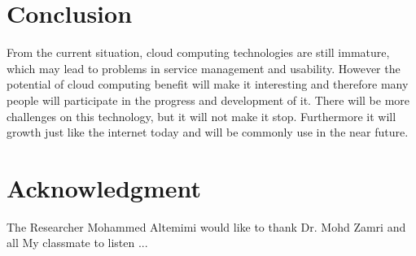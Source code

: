 \documentclass[conference, compsoc]{IEEEtran}
\begin{document}
\section{}



\section{Conclusion}
From the current situation, cloud computing technologies are still immature, which may lead to problems in service management and usability. However  the potential of cloud computing benefit will make it interesting and therefore many people will participate in the progress and development of it. There will be more challenges on this technology, but it will not make it stop. Furthermore it will growth just like the internet today and will be commonly use in the near future.

\section*{Acknowledgment}
The Researcher Mohammed Altemimi would like to thank Dr. Mohd Zamri and all My classmate to listen ...



%
%
%



\end{document}
